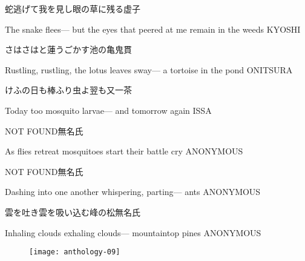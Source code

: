 \begin{haiku}
    {\FH 蛇逃げて我を見し眼の草に残る}\hfill{\FH 虚子}

    \vin{} The snake flees---
    \vin{} \vin{} but the eyes that peered at me
    \vin{} \vin{} \vin{} remain in the weeds \hspace{\fill} KYOSHI
\end{haiku}

\begin{haiku}
    {\FH さはさはと蓮うごかす池の亀}\hfill{\FH 鬼貫}

    \vin{} Rustling, rustling,
    \vin{} \vin{} the lotus leaves sway---
    \vin{} \vin{} \vin{} a tortoise in the pond \hspace{\fill} ONITSURA
\end{haiku}

\begin{haiku}
    {\FH けふの日も棒ふり虫よ翌も又}\hfill{\FH 一茶}

    \vin{} Today too
    \vin{} \vin{} mosquito larvae---
    \vin{} \vin{} \vin{} and tomorrow again \hspace{\fill} ISSA
\end{haiku}

\begin{haiku}
    NOT FOUND\hfill{\FH 無名氏}

    \vin{} As flies retreat
    \vin{} \vin{} mosquitoes start
    \vin{} \vin{} \vin{} their battle cry \hspace{\fill} ANONYMOUS
\end{haiku}

\begin{haiku}
    NOT FOUND\hfill{\FH 無名氏}

    \vin{} Dashing into one another
    \vin{} \vin{} whispering, parting---
    \vin{} \vin{} \vin{} ants \hspace{\fill} ANONYMOUS
\end{haiku}

\begin{haiku}
    {雲を吐き雲を吸い込む峰の松}\hfill{\FH 無名氏}

    \vin{} Inhaling clouds
    \vin{} \vin{} exhaling clouds---
    \vin{} \vin{} \vin{} mountaintop pines \hspace{\fill} ANONYMOUS
\end{haiku}

\begin{figure}
    \texttt{[image: anthology-09]}
\end{figure}

